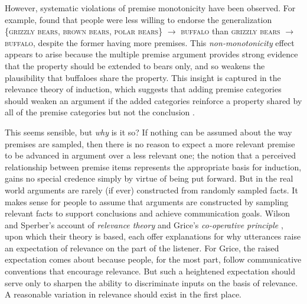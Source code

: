\documentclass[doc,12pt]{apa}
\newcommand{\category}[1]{\textsc{#1}}
\newcommand{\oneargument}[2]{{#1} $\rightarrow$ {#2}}
\newcommand{\threeargument}[4]{\{{#1}, {#2}, {#3}\} $\rightarrow$ {#4}}
\begin{document}
However, systematic violations of premise monotonicity have been observed. For example,  found that people were less willing to endorse the generalization \threeargument{\category{grizzly bears}}{\category{brown bears}}{\category{polar bears}}{\category{buffalo}} than \oneargument{\category{grizzly bears}}{\category{buffalo}}, despite the former having more premises. This {\em non-monotonicity} effect appears to arise because the multiple premise argument provides strong evidence that the property should be extended to bears only, and so weakens the plausibility that buffaloes share the property. This insight is captured in the relevance theory of induction, which suggests that adding premise categories should weaken an argument if the added categories reinforce a property shared by all of the premise categories but not the conclusion \cite{MCSH03}.



This seems sensible, but {\em why} is it so? If nothing can be assumed about the way premises are sampled, then there is no reason to expect a more relevant premise to be advanced in argument over a less relevant one; the notion that a perceived relationship between premise items represents the appropriate basis for induction, gains no special credence simply by virtue of being put forward.  But in the real world arguments are rarely (if ever) constructed from randomly sampled facts. It makes sense for people to assume that arguments are constructed by sampling relevant facts to support conclusions and achieve communication goals. Wilson and Sperber's account of {\em relevance theory} \cite{WS04} and Grice's {\em co-operative principle} \cite{Gri89}, upon which their theory is based, each offer explanations for why utterances raise an expectation of relevance on the part of the listener. For Grice, the raised expectation comes about because people, for the most part, follow communicative conventions that encourage relevance. But such a heightened expectation should serve only to sharpen the ability to discriminate inputs on the basis of relevance. A reasonable variation in relevance should exist in the first place.
\end{document}
